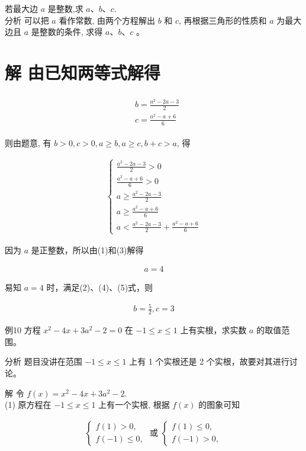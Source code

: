 \documentclass[10pt]{article}
\begin{document}
若最大边 $a$ 是整数,求 $a 、 b 、 c$.\\
分析 可以把 $a$ 看作常数, 由两个方程解出 $b$ 和 $c$, 再根据三角形的性质和 $a$ 为最大边且 $a$ 是整数的条件, 求得 $a 、 b 、 c$ 。

\section*{解 由已知两等式解得}
\begin{align*}
\begin{aligned}
& b=\frac{a^{2}-2 a-3}{2} \\
& c=\frac{a^{2}-a+6}{6}
\end{aligned}
\end{align*}

则由题意, 有 $b>0, c>0, a \geqslant b, a \geqslant c, b+c>a$, 得

\begin{align*}
\left\{\begin{array}{l}
\frac{a^{2}-2 a-3}{2}>0  \tag{1}\\
\frac{a^{2}-a+6}{6}>0 \\
a \geqslant \frac{a^{2}-2 a-3}{2} \\
a \geqslant \frac{a^{2}-a+6}{6} \\
a<\frac{a^{2}-2 a-3}{2}+\frac{a^{2}-a+6}{6}
\end{array}\right.
\end{align*}

因为 $a$ 是正整数，所以由(1)和(3)解得

\begin{align*}
a=4
\end{align*}

易知 $a=4$ 时，满足(2)、(4)、(5)式，则

\begin{align*}
b=\frac{5}{2}, c=3
\end{align*}

例10 方程 $x^{2}-4 x+3 a^{2}-2=0$ 在 $-1 \leqslant x \leqslant 1$ 上有实根，求实数 $a$ 的取值范围。

分析 题目没讲在范围 $-1 \leqslant x \leqslant 1$ 上有 1 个实根还是 2 个实根，故要对其进行讨论。

解 令 $f(x)=x^{2}-4 x+3 a^{2}-2$.\\
(1) 原方程在 $-1 \leqslant x \leqslant 1$ 上有一个实根, 根据 $f(x)$ 的图象可知

\begin{align*}
\left\{\begin{array} { l } 
{ f ( 1 ) > 0 , } \\
{ f ( - 1 ) \leqslant 0 , }
\end{array} \text { 或 } \left\{\begin{array}{l}
f(1) \leqslant 0, \\
f(-1)>0,
\end{array}\right.\right.
\end{align*}
\end{document}

